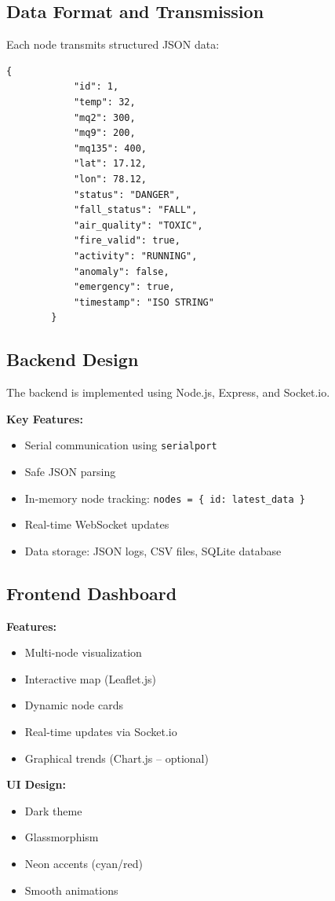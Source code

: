 \documentclass[12pt,a4paper]{article}
\begin{document}
	\subsection{Data Format and Transmission}
	Each node transmits structured JSON data:
	
	\begin{lstlisting}[language={}]
		{
			"id": 1,
			"temp": 32,
			"mq2": 300,
			"mq9": 200,
			"mq135": 400,
			"lat": 17.12,
			"lon": 78.12,
			"status": "DANGER",
			"fall_status": "FALL",
			"air_quality": "TOXIC",
			"fire_valid": true,
			"activity": "RUNNING",
			"anomaly": false,
			"emergency": true,
			"timestamp": "ISO STRING"
		}
	\end{lstlisting}
	
	\subsection{Backend Design}
	The backend is implemented using Node.js, Express, and Socket.io.
	
	\noindent\textbf{Key Features:}
	\begin{itemize}
		\item Serial communication using \texttt{serialport}
		\item Safe JSON parsing
		\item In-memory node tracking: \texttt{nodes = \{ id: latest\_data \}}
		\item Real-time WebSocket updates
		\item Data storage: JSON logs, CSV files, SQLite database
	\end{itemize}
	
	\subsection{Frontend Dashboard}
	
	\noindent\textbf{Features:}
	\begin{itemize}
		\item Multi-node visualization
		\item Interactive map (Leaflet.js)
		\item Dynamic node cards
		\item Real-time updates via Socket.io
		\item Graphical trends (Chart.js -- optional)
	\end{itemize}
	
	\noindent\textbf{UI Design:}
	\begin{itemize}
		\item Dark theme
		\item Glassmorphism
		\item Neon accents (cyan/red)
		\item Smooth animations
	\end{itemize}
	
\end{document}
